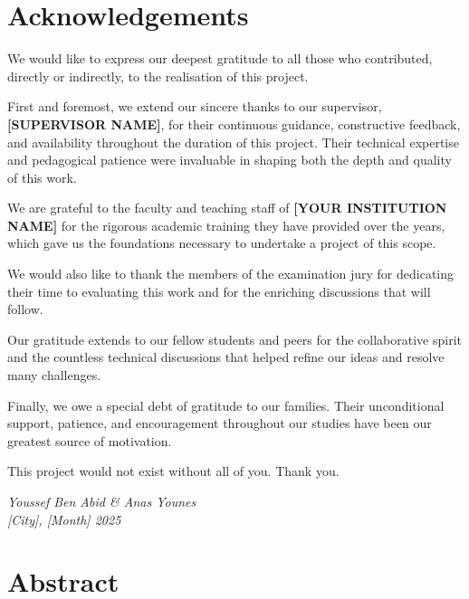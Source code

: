 \documentclass[12pt,a4paper,openright]{report}
\begin{document}
\cleardoublepage
\chapter*{Acknowledgements}
\thispagestyle{fancy}

We would like to express our deepest gratitude to all those who contributed, directly or indirectly, to the realisation of this project.

First and foremost, we extend our sincere thanks to our supervisor, \textbf{[SUPERVISOR NAME]}, for their continuous guidance, constructive feedback, and availability throughout the duration of this project. Their technical expertise and pedagogical patience were invaluable in shaping both the depth and quality of this work.

We are grateful to the faculty and teaching staff of \textbf{[YOUR INSTITUTION NAME]} for the rigorous academic training they have provided over the years, which gave us the foundations necessary to undertake a project of this scope.

We would also like to thank the members of the examination jury for dedicating their time to evaluating this work and for the enriching discussions that will follow.

Our gratitude extends to our fellow students and peers for the collaborative spirit and the countless technical discussions that helped refine our ideas and resolve many challenges.

Finally, we owe a special debt of gratitude to our families. Their unconditional support, patience, and encouragement throughout our studies have been our greatest source of motivation.

This project would not exist without all of you. Thank you.

\vspace{1cm}
\begin{flushright}
\textit{Youssef Ben Abid \& Anas Younes}\\
\textit{[City], [Month] 2025}
\end{flushright}

\cleardoublepage
\chapter*{Abstract}
\thispagestyle{fancy}
\end{document}
